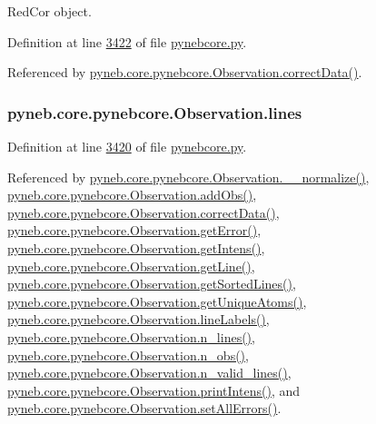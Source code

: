 Red\+Cor object. 



Definition at line \hyperlink{pynebcore_8py_source_l03422}{3422} of file \hyperlink{pynebcore_8py_source}{pynebcore.\+py}.



Referenced by \hyperlink{pynebcore_8py_source_l03906}{pyneb.\+core.\+pynebcore.\+Observation.\+correct\+Data()}.

\hypertarget{classpyneb_1_1core_1_1pynebcore_1_1_observation_a78332043ca9f290590edf6b8a1e5b767}{}
\subsubsection[{lines}]{\setlength{\rightskip}{0pt plus 5cm}pyneb.\+core.\+pynebcore.\+Observation.\+lines}\label{classpyneb_1_1core_1_1pynebcore_1_1_observation_a78332043ca9f290590edf6b8a1e5b767}


Definition at line \hyperlink{pynebcore_8py_source_l03420}{3420} of file \hyperlink{pynebcore_8py_source}{pynebcore.\+py}.



Referenced by \hyperlink{pynebcore_8py_source_l03885}{pyneb.\+core.\+pynebcore.\+Observation.\+\_\+\+\_\+normalize()}, \hyperlink{pynebcore_8py_source_l03467}{pyneb.\+core.\+pynebcore.\+Observation.\+add\+Obs()}, \hyperlink{pynebcore_8py_source_l03906}{pyneb.\+core.\+pynebcore.\+Observation.\+correct\+Data()}, \hyperlink{pynebcore_8py_source_l03809}{pyneb.\+core.\+pynebcore.\+Observation.\+get\+Error()}, \hyperlink{pynebcore_8py_source_l03782}{pyneb.\+core.\+pynebcore.\+Observation.\+get\+Intens()}, \hyperlink{pynebcore_8py_source_l03543}{pyneb.\+core.\+pynebcore.\+Observation.\+get\+Line()}, \hyperlink{pynebcore_8py_source_l03562}{pyneb.\+core.\+pynebcore.\+Observation.\+get\+Sorted\+Lines()}, \hyperlink{pynebcore_8py_source_l03578}{pyneb.\+core.\+pynebcore.\+Observation.\+get\+Unique\+Atoms()}, \hyperlink{pynebcore_8py_source_l03493}{pyneb.\+core.\+pynebcore.\+Observation.\+line\+Labels()}, \hyperlink{pynebcore_8py_source_l03502}{pyneb.\+core.\+pynebcore.\+Observation.\+n\+\_\+lines()}, \hyperlink{pynebcore_8py_source_l03520}{pyneb.\+core.\+pynebcore.\+Observation.\+n\+\_\+obs()}, \hyperlink{pynebcore_8py_source_l03511}{pyneb.\+core.\+pynebcore.\+Observation.\+n\+\_\+valid\+\_\+lines()}, \hyperlink{pynebcore_8py_source_l03836}{pyneb.\+core.\+pynebcore.\+Observation.\+print\+Intens()}, and \hyperlink{pynebcore_8py_source_l03934}{pyneb.\+core.\+pynebcore.\+Observation.\+set\+All\+Errors()}.

